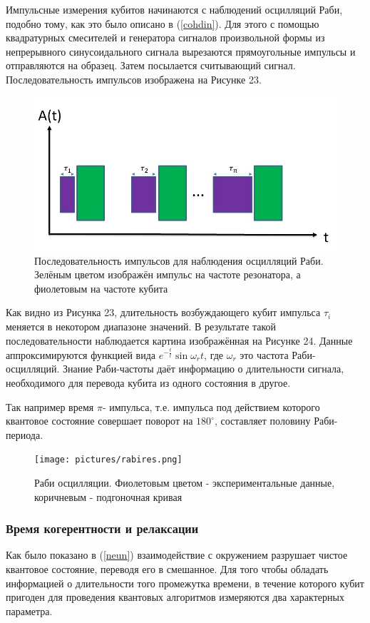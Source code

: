 Импульсные измерения кубитов начинаются с наблюдений осцилляций Раби, подобно тому, как это было описано в (\ref{cohdin}). Для этого с помощью квадратурных смесителей и генератора сигналов произвольной формы из непрерывного синусоидального сигнала вырезаются прямоугольные импульсы и отправляются на образец. Затем посылается считывающий сигнал. Последовательность импульсов изображена на Рисунке 23.
\begin{figure}[h]
	\centering
	\includegraphics[width=0.6\linewidth]{pictures/Rabipulseseq}
	\caption{Последовательность импульсов для наблюдения осцилляций Раби. Зелёным цветом изображён импульс на частоте резонатора, а фиолетовым на частоте кубита}
	\label{fig:rabipulseseq}
\end{figure}

Как видно из Рисунка 23,  длительность возбуждающего кубит импульса $\tau_i$ меняется в некотором диапазоне значений. В результате такой последовательности наблюдается картина изображённая на Рисунке 24. Данные аппроксимируются функцией вида $e^{-\frac{t}{t}} \sin{\omega_r t}$, где $\omega_r$ это частота Раби-осцилляций. Знание Раби-частоты даёт информацию о длительности сигнала, необходимого для перевода кубита из одного состояния в другое. 

Так например время $\pi$- импульса, т.е. импульса под действием которого квантовое состояние совершает поворот на $180^{\circ}$, составляет половину Раби-периода.
\clearpage

\begin{figure}[h]
	\centering
	\texttt{[image: pictures/rabires.png]}
	\caption{Раби осцилляции. Фиолетовым цветом - экспериментальные данные, коричневым - подгоночная кривая}
	\label{fig:rabires}
\end{figure}


\subsubsection{Время когерентности и релаксации}
Как было показано в  (\ref{neun}) взаимодействие с окружением разрушает чистое квантовое состояние, переводя его в смешанное. Для того чтобы обладать информацией о длительности того промежутка времени, в течение которого кубит пригоден для проведения квантовых алгоритмов измеряются два характерных параметра.

